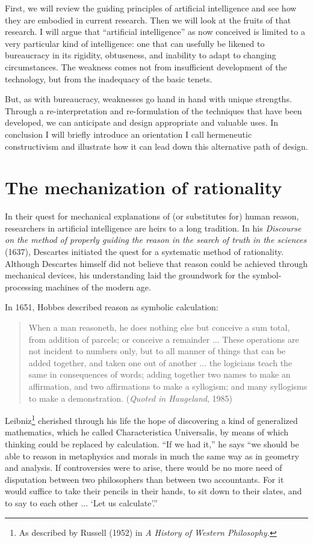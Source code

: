\documentclass[12pt]{article}
\begin{document}
First, we will review the guiding principles of artificial intelligence and see how they are embodied in current research. Then we will look at the fruits of that research. I will argue that ``artificial intelligence'' as now conceived is limited to a very particular kind of intelligence: one that can usefully be likened to bureaucracy in its rigidity, obtuseness, and inability to adapt to changing circumstances. The weakness comes not from insufficient development of the technology, but from the inadequacy of the basic tenets.

But, as with bureaucracy, weaknesses go hand in hand with unique strengths. Through a re-interpretation and re-formulation of the techniques that have been developed, we can anticipate and design appropriate and valuable uses. In conclusion I will briefly introduce an orientation I call hermeneutic constructivism and illustrate how it can lead down this alternative path of design.

\section{The mechanization of rationality}

In their quest for mechanical explanations of (or substitutes for) human reason, researchers in artificial intelligence are heirs to a long tradition. In his {\it Discourse on the method of properly guiding the reason in the search of truth in the sciences} (1637), Descartes initiated the quest for a systematic method of rationality. Although Descartes himself did not believe that reason could be achieved through mechanical devices, his understanding laid the groundwork for the symbol-processing machines of the modern age.

In 1651, Hobbes described reason as symbolic calculation:

\begin{quote}
When a man reasoneth, he does nothing else but conceive a sum total, from addition of parcels; or conceive a remainder ... These operations are not incident to numbers only, but to all manner of things that can be added together, and taken one out of another ... the logicians teach the same in consequences of words; adding together two names to make an affirmation, and two affirmations to make a syllogism; and many syllogisms to make a demonstration. ({\it Quoted in Haugeland}, 1985)
\end{quote}

\noindent
Leibniz\footnote{As described by Russell (1952) in {\it A History of Western Philosophy.}} cherished through his life the hope of discovering a kind of generalized mathematics, which he called Characteristica Universalis, by means of which thinking could be replaced by calculation. ``If we had it,'' he says ``we should be able to reason in metaphysics and morals in much the same way as in geometry and analysis. If controversies were to arise, there would be no more need of disputation between two philosophers than between two accountants. For it would suffice to take their pencils in their hands, to sit down to their slates, and to say to each other ... ‘Let us calculate’.''
\end{document}
